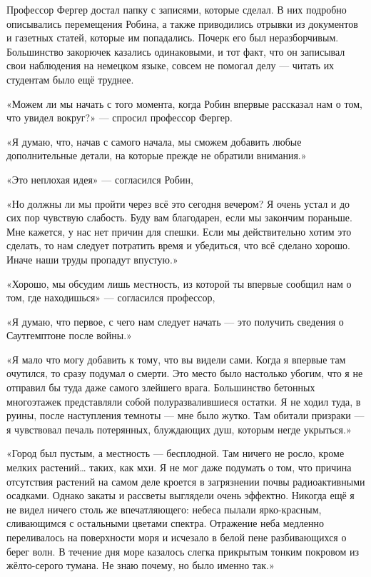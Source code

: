 \documentclass[a5paper, 9pt,
final, openany, twoside=true]{memoir}
\begin{document}
Профессор Фергер достал папку с записями, которые сделал. В них подробно описывались перемещения Робина, а также приводились отрывки из документов и газетных статей, которые им попадались. Почерк его был неразборчивым. Большинство закорючек казались одинаковыми, и тот факт, что он записывал свои наблюдения на немецком языке, совсем не помогал делу — читать их студентам было ещё труднее.

«Можем ли мы начать с того момента, когда Робин впервые рассказал нам о том, что увидел вокруг?» — спросил профессор Фергер.

«Я думаю, что, начав с самого начала, мы сможем добавить любые дополнительные детали, на которые прежде не обратили внимания.»

«Это неплохая идея» — согласился Робин,

«Но должны ли мы пройти через всё это сегодня вечером? Я очень устал и до сих пор чувствую слабость. Буду вам благодарен, если мы закончим пораньше. Мне кажется, у нас нет причин для спешки. Если мы действительно хотим это сделать, то нам следует потратить время и убедиться, что всё сделано хорошо. Иначе наши труды пропадут впустую.»

«Хорошо, мы обсудим лишь местность, из которой ты впервые сообщил нам о том, где находишься» — согласился профессор,

«Я думаю, что первое, с чего нам следует начать — это получить сведения о Саутгемптоне после войны.»

«Я мало что могу добавить к тому, что вы видели сами. Когда я впервые там очутился, то сразу подумал о смерти. Это место было настолько убогим, что я не отправил бы туда даже самого злейшего врага. Большинство бетонных многоэтажек представляли собой полуразвалившиеся остатки. Я не ходил туда, в руины, после наступления темноты — мне было жутко. Там обитали призраки — я чувствовал печаль потерянных, блуждающих душ, которым негде укрыться.»

«Город был пустым, а местность — бесплодной. Там ничего не росло, кроме мелких растений… таких, как мхи. Я не мог даже подумать о том, что причина отсутствия растений на самом деле кроется в загрязнении почвы радиоактивными осадками. Однако закаты и рассветы выглядели очень эффектно. Никогда ещё я не видел ничего столь же впечатляющего: небеса пылали ярко-красным, сливающимся с остальными цветами спектра. Отражение неба медленно переливалось на поверхности моря и исчезало в белой пене разбивающихся о берег волн. В течение дня море казалось слегка прикрытым тонким покровом из жёлто-серого тумана. Не знаю почему, но было именно так.»
\end{document}
